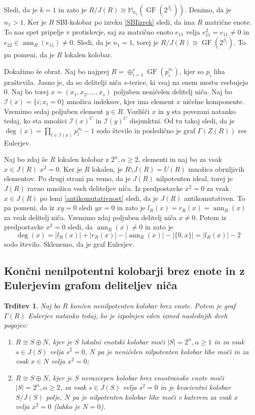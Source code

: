 \documentclass[a4paper, 12pt]{amsart}
\theoremstyle{definition} %
\theoremstyle{plain} %
\newtheorem{trditev}[definicija]{Trditev}
\newcommand{\M}{\mathbb M}
\DeclareMathOperator{\ann}{ann}
\DeclareMathOperator{\GF}{GF}
\begin{document}
Sledi, da je $k=1$ in zato je $R/J(R) \cong \M_{n_1}(\GF(2^{\beta_1}))$. Denimo, da je $n_1 > 1$. Ker je $R$ SBI-kolobar po izreku \ref{SBIizrek} sledi, da ima $R$ matrične enote. To nas spet pripelje v protislovje, saj za matrično enoto $e_{11}$ velja $e_{11}^2 = e_{11} \neq 0$ in $e_{22}\in \ann_R(e_{11}) \neq 0$. Sledi, da je $n_1 = 1$, torej je $R/J(R) \cong \GF(2^{\beta_i})$. To pa pomeni, da je $R$  lokalen kolobar.

Dokažimo še obrat. Naj bo najprej $R= \oplus_{i=1}^s \GF(p_i^{\alpha_i})$, kjer so $p_i$ liha praštevila. Jasno je, da so delitelji niča $s$-terice, ki vsaj na enem mestu vsebujejo 0. Naj bo torej $x=(x_1,x_2,\dots,x_s)$ poljuben neničelen delitelj  niča. Naj bo $\mathcal{I}(x)=\{i;x_i=0\}$ množica indeksov, kjer ima element $x$ ničelne komponente. Vzemimo sedaj poljuben element $y\in R$. Vozlišči $x$ in $y$ sta povezani natanko tedaj, ko sta množici $\mathcal{I}(x)^C$ in $\mathcal{I}(y)^C$ disjunktni. Od tu takoj sledi, da je $\deg(x) = \prod_{l\in \mathcal{I}(x)} p_l^{\alpha_l}-1$ sodo število in posledično je graf $\Gamma(Z(R))$ res Eulerjev.

Naj bo zdaj še $R$ lokalen kolobar z $2^\alpha, \alpha \ge 2$, elementi in naj bo za vsak $x\in J(R)$ $ x^2 = 0$. Ker je $R$ lokalen,  je $R\setminus J(R)=U(R)$ množica obrnljivih elementov. Po drugi strani pa vemo, da je $J(R)$ nilpotenten ideal, torej je $J(R)$ ravno množica vseh deliteljev niča. Iz predpostavke $x^2 = 0$ za vsak $x\in J(R)$ po lemi \ref{antikomutativnost} sledi, da je $J(R)$ antikomutativen. To pa pomeni, da iz $xy = 0$ sledi $yx=0$ in zato je $l_R(x) = r_R(x) = \ann_R(x)$ za vsak delitelj niča. Vzemimo zdaj poljuben delitelj niča $x\neq 0$. Potem iz predpostavke $x^2 = 0$ sledi, da $\ann_R(x)\neq 0$ in zato je 
$$
\deg(x) = |l_R(x)| + |r_R(x)| -| \ann_R(x) | - |\{0,x\}| = |l_R(x)| -2 
$$
sodo število. Sklenemo, da je graf Eulerjev. 
\endproof

\subsection{Končni nenilpotentni kolobarji brez enote in z Eulerjevim grafom deliteljev niča}

\begin{trditev}
\label{EulerBrezEnote}
Naj bo $R$ končen nenilpotenten kolobar brez enote. Potem je graf $\Gamma(R)$ Eulerjev natanko tedaj, ko je izpolnjen eden izmed naslednjih dveh pogojev:
\begin{enumerate}
\item $R\cong S \oplus N$, kjer je $S$ lokalni enotski kolobar moči $|S| = 2^{\alpha}, \alpha \ge 1$ in za vsak $s\in J(S)$ velja $s^2 = 0$, $N$ pa je neničelen nilpotenten kolobar lihe moči in za vsak $x\in N$ velja $x^2 = 0$;
\item $R\cong S\oplus N$, kjer je $S$ nerazcepen kolobar brez enostranske enote moči $|S| = 2^{\alpha}, \alpha\ge 2$, za vsak $s\in J(S)$ velja $s^2 = 0$ in je kvocientni kolobar $S/J(S)$ polje, $N$ pa je nilpotenten kolobar lihe moči v katerem za vsak $x$ velja $x^2 =0 $ (lahko je $N=0$). 
\end{enumerate}
\end{trditev}
\end{document}

